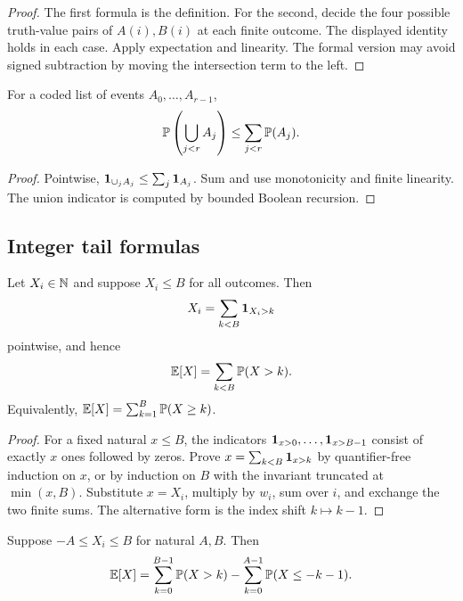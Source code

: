 \begin{proof}
The first formula is the definition.  For the second, decide the four possible
truth-value pairs of \(A(i),B(i)\) at each finite outcome.  The displayed
identity holds in each case.  Apply expectation and linearity.  The formal
version may avoid signed subtraction by moving the intersection term to the
left.
\end{proof}

\begin{corollary}\label{cor:union-bound}
For a coded list of events \(A_0,\ldots,A_{r-1}\),
\[
 \mathbb P\left(\bigcup_{j<r}A_j\right)\le\sum_{j<r}\mathbb P(A_j).
\]
\end{corollary}

\begin{proof}
Pointwise,
\(\mathbf 1_{\cup_jA_j}\le\sum_j\mathbf 1_{A_j}\).  Sum and use monotonicity and finite
linearity.  The union indicator is computed by bounded Boolean recursion.
\end{proof}

\subsection{Integer tail formulas}

\begin{theorem}\label{thm:tail-sum}
Let \(X_i\in\mathbb N\) and suppose \(X_i\le B\) for all outcomes.  Then
\[
 X_i=\sum_{k<B}\mathbf 1_{X_i>k}
\]
pointwise, and hence
\[
 \mathbb E[X]=\sum_{k<B}\mathbb P(X>k).
\]
Equivalently,
\(\mathbb E[X]=\sum_{k=1}^{B}\mathbb P(X\ge k)\).
\end{theorem}

\begin{proof}
For a fixed natural \(x\le B\), the indicators
\(\mathbf 1_{x>0},\ldots,\mathbf 1_{x>B-1}\) consist of exactly \(x\) ones followed by
zeros.  Prove
\(x=\sum_{k<B}\mathbf 1_{x>k}\) by quantifier-free induction on \(x\), or by
induction on \(B\) with the invariant truncated at \(\min(x,B)\).  Substitute
\(x=X_i\), multiply by \(w_i\), sum over \(i\), and exchange the two finite
sums.  The alternative form is the index shift \(k\mapsto k-1\).
\end{proof}

\begin{theorem}\label{thm:signed-tail}
Suppose \(-A\le X_i\le B\) for natural \(A,B\).  Then
\[
 \mathbb E[X]
 =\sum_{k=0}^{B-1}\mathbb P(X>k)
  -\sum_{k=0}^{A-1}\mathbb P(X\le -k-1).
\]
\end{theorem}

